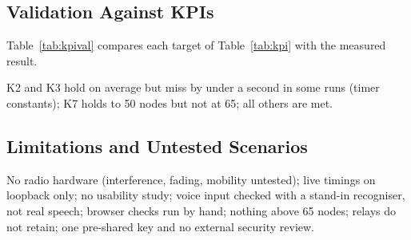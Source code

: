 \subsection{Validation Against KPIs}
\label{sec:kpival}
Table~\ref{tab:kpival} compares each target of Table~\ref{tab:kpi} with the measured result.

K2 and K3 hold on average but miss by under a second in some runs (timer constants); K7 holds to 50 nodes but not at 65; all others are met.

\subsection{Limitations and Untested Scenarios}
\label{sec:limits}
No radio hardware (interference, fading, mobility untested); live timings on loopback only; no usability study; voice input checked with a stand-in recogniser, not real speech; browser checks run by hand; nothing above 65 nodes; relays do not retain; one pre-shared key and no external security review.
\endgroup
